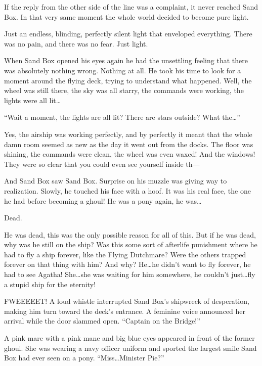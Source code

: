 If the reply from the other side of the line was a complaint, it never reached Sand Box. In that very same moment the whole world decided to become pure light.

Just an endless, blinding, perfectly silent light that enveloped everything. There was no pain, and there was no fear. Just light.



\horizonline

\englishunknowndaytimeplace

When Sand Box opened his eyes again he had the unsettling feeling that there was absolutely nothing wrong. Nothing at all. He took his time to look for a moment around the flying deck, trying to understand what happened. Well, the wheel was still there, the sky was all starry, the commands were working, the lights were all lit\dots

``Wait a moment, the lights are all lit? There are stars outside? What the\dots''

Yes, the airship was working perfectly, and by perfectly it meant that the whole damn room seemed as new as the day it went out from the docks. The floor was shining, the commands were clean, the wheel was even waxed! And the windows! They were so clear that you could even see yourself inside th---

And Sand Box saw Sand Box. Surprise on his muzzle was giving way to realization. Slowly, he touched his face with a hoof. It was his real face, the one he had before becoming a ghoul! He was a pony again, he was\dots

Dead.

He was dead, this was the only possible reason for all of this. But if he was dead, why was he still on the ship? Was this some sort of afterlife punishment where he had to fly a ship forever, like the Flying Dutchmare? Were the others trapped forever on that thing with him? And why? He\dots he didn't want to fly forever, he had to see Agatha! She\dots she was waiting for him somewhere, he couldn't just\dots fly a stupid ship for the eternity!

FWEEEEET! A loud whistle interrupted Sand Box's shipwreck of desperation, making him turn toward the deck's entrance. A feminine voice announced her arrival while the door slammed open. ``Captain on the Bridge!''

A pink mare with a pink mane and big blue eyes appeared in front of the former ghoul. She was wearing a navy officer uniform and sported the largest smile Sand Box had ever seen on a pony. ``Miss\dots Minister Pie?''

